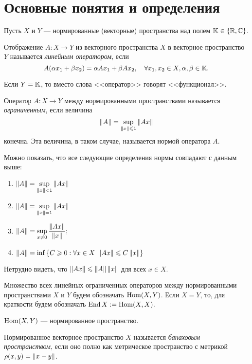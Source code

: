 \chapter{Основные понятия и определения}
Пусть $X$ и $Y$ --- нормированные (векторные) пространства над полем $\mathbb{K} \in \left\{\mathbb{R},\mathbb{C}\right\}$.

\begin{definition}
    Отображение $A \colon X \to Y$ из векторного пространства $X$ в векторное пространство $Y$
    называется \emph{линейным оператором}, если
    \[ A(\alpha x_1 + \beta x_2) = \alpha Ax_1 + \beta Ax_2, \quad \forall x_1,
    x_2 \in X, \alpha, \beta \in \mathbb{K}. \]
\end{definition}

Если $Y = \mathbb{K}$, то вместо слова <<оператор>> говорят <<функционал>>.

\begin{definition}
    Оператор $A \colon X \to Y$ между нормированными пространствами 
    называется \emph{ограниченным}, если величина
    \[ \left\|A\right\| = \sup_{\left\|x\right\| \leqslant 1} \left\|Ax\right\| \]
    конечна. Эта величина, в таком случае, называется нормой оператора $A$.
\end{definition}


Можно показать, что все следующие определения нормы совпадают с данным выше:
\begin{enumerate}
    \item $ \left\|A\right\| = \sup\limits_{\left\|x\right\| < 1} \left\|Ax\right\| $
    \item $ \left\|A\right\| = \sup\limits_{\left\|x\right\| = 1} \left\|Ax\right\| $
    \item $ \left\|A\right\| = \sup\limits_{x\neq 0}\displaystyle\frac{\left\|Ax\right\|}{\left\|x\right\|}; $
    \item $ \left\|A\right\| = \inf\left\{C \geqslant 0 : \forall x \in X \; \left\|Ax\right\| \leqslant C
        \left\|x\right\|\right\} $
\end{enumerate}

Нетрудно видеть, что $\left\|Ax\right\| \leqslant \left\|A\right\|\left\|x\right\|$ для всех $x \in X$.

Множество всех линейных ограниченных операторов между нормированными
пространствами $X$ и $Y$ будем обозначать $\operatorname{Hom}(X, Y)$. Если $X = Y$, то, для краткости будем обозначать $\operatorname{End} X := \operatorname{Hom}(X, X)$.

\begin{theorem}
    $\operatorname{Hom}(X, Y)$ --- нормированное пространство.
\end{theorem}

\begin{definition}
    Нормированное векторное пространство $X$ называется \emph{банаховым пространством}, если оно полно как метрическое пространство с метрикой $\rho(x, y) = \left\|x - y\right\|$.
\end{definition}

